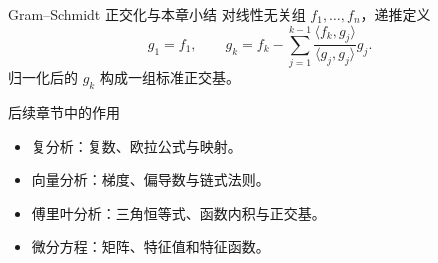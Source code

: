 \begin{frame}{Gram--Schmidt 正交化与本章小结}
  对线性无关组 $f_1,\ldots,f_n$，递推定义
  \[
    g_1=f_1,\qquad
    g_k=f_k-\sum_{j=1}^{k-1}
    \frac{\langle f_k,g_j\rangle}{\langle g_j,g_j\rangle}g_j.
  \]
  归一化后的 $g_k$ 构成一组标准正交基。
  \begin{block}{后续章节中的作用}
    \begin{itemize}
      \item 复分析：复数、欧拉公式与映射。
      \item 向量分析：梯度、偏导数与链式法则。
      \item 傅里叶分析：三角恒等式、函数内积与正交基。
      \item 微分方程：矩阵、特征值和特征函数。
    \end{itemize}
  \end{block}
\end{frame}
